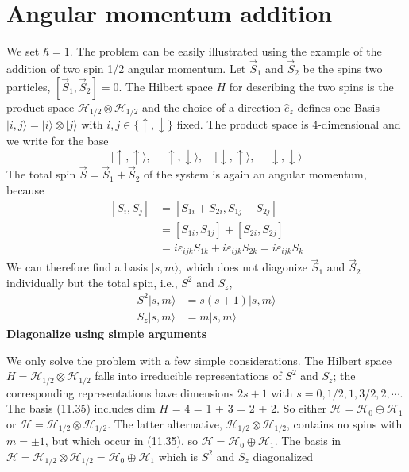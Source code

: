 \section{Angular momentum addition}
We set $\hbar=1$. The problem can be easily illustrated using the example of the addition of two spin 1/2 angular momentum. Let $\vec{S}_1$ and $\vec{S}_2$ be the spins two particles, $[\vec{S}_1,\vec{S}_2] = 0$. The Hilbert space $H$ for describing the two spins is the product space $\mathcal{H}_{1/2}\otimes\mathcal{H}_{1/2}$ and the choice of a direction $\hat{e}_z$ defines one Basis $|i, j\rangle=|i\rangle \otimes|j\rangle$ with $i, j \in\{\uparrow, \downarrow\}$ fixed. The product space is 4-dimensional and we write for the base
\begin{equation}
    |\uparrow, \uparrow\rangle, \quad|\uparrow, \downarrow\rangle, \quad|\downarrow, \uparrow\rangle, \quad|\downarrow, \downarrow\rangle
    \end{equation}
The total spin $\vec{S}=\vec{S}_{1}+\vec{S}_{2}$ of the system is again an angular momentum, because
\begin{equation}
\begin{aligned}\left[S_{i}, S_{j}\right] &=\left[S_{1 i}+S_{2 i}, S_{1 j}+S_{2 j}\right] \\ &=\left[S_{1 i}, S_{1 j}\right]+\left[S_{2 i}, S_{2 j}\right] \\ &=i \varepsilon_{i j k} S_{1 k}+i \varepsilon_{i j k} S_{2 k}=i \varepsilon_{i j k} S_k\end{aligned}
\end{equation}
We can therefore find a basis $ | s, m\rangle$, which does not diagonize $\vec{S}_1$ and $\vec{S}_2$ individually but the total spin, i.e., $S^2$ and $S_z$,
\begin{equation}
\begin{aligned} S^{2}|s, m\rangle &= s(s+1)|s, m\rangle \\ S_{z}|s, m\rangle &= m|s, m\rangle \end{aligned}
\end{equation}
\textbf{Diagonalize using simple arguments}\par
We only solve the problem with a few simple considerations. The Hilbert space $H = \mathcal{H}_{1/2}\otimes \mathcal{H}_{1/2}$ falls into irreducible representations of $S^2$ and $S_z$; the corresponding representations have dimensions $2s + 1$ with $s = 0, 1/2, 1, 3/2, 2, \cdots. $ The basis (11.35) includes dim $H$ = 4 = 1 + 3 = 2 + 2. So either $ \mathcal{H}=\mathcal{H}_0 \oplus \mathcal{H}_1$ or $\mathcal{H} = \mathcal{H}_{1/2} \otimes \mathcal{H}_{1/2}$. The latter alternative, $\mathcal{H}_{1/2} \otimes \mathcal{H}_{1/2}$, contains no spins with $m = \pm 1$, but which occur in (11.35), so $ \mathcal{H}=\mathcal{H}_0 \oplus \mathcal{H}_1$. The basis in $\mathcal{H}= \mathcal{H}_{1/2} \otimes \mathcal{H}_{1/2} = \mathcal{H}_0 \oplus \mathcal{H}_1$ which is $S^2$ and $S_z$ diagonalized
